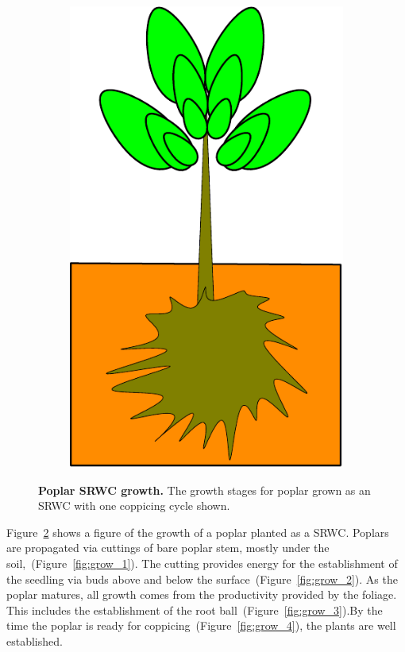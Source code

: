 \documentclass[10pt]{article}
\begin{document}
\begin{figure}[!ht]
\begin{subfigure}[b]{.1125\linewidth}
\includegraphics[width=1.0\linewidth]{img/tree_pics_4}
\caption{}  %
\label{fig:grow_8}
\end{subfigure}
\caption{ \textbf{Poplar \ac{SRWC} growth.} The growth stages for poplar
  grown as an \ac{SRWC} with one coppicing cycle shown. }
\label{fig:grow}
\end{figure}

Figure~\ref{fig:grow} shows a figure of the growth of a poplar planted
as a \ac{SRWC}.  Poplars are propagated via cuttings of bare poplar
stem, mostly under the soil,~(Figure~\ref{fig:grow_1}).  The cutting
provides energy for the establishment of the seedling via buds above
and below the surface~(Figure~\ref{fig:grow_2}). As the poplar
matures, all growth comes from the productivity provided by the
foliage.  This includes the establishment of the root
ball~(Figure~\ref{fig:grow_3}).By the time the poplar is ready for
coppicing~(Figure~\ref{fig:grow_4}), the plants are well established.
\end{document}
